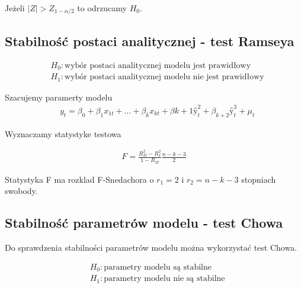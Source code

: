 Jeżeli \(|Z| > Z_{1-\alpha/2}\) to odrzucamy \(H_0\).

\subsection{Stabilność postaci analitycznej - test Ramseya}\label{subsec:stabilność-postaci-analitycznej---test-ramseya}

\begin{equation}
    \begin{split}
        &H_0: \text{wybór postaci analitycznej modelu jest prawidłowy} \\
        &H_1: \text{wybór postaci analitycznej modelu nie jest prawidłowy}
    \end{split}
\end{equation}


Szacujemy paramerty modelu
\begin{equation}
    \begin{split}
        &y_{t} = \beta_{0} + \beta_{1}x_{1t} + \dots + \beta_{k}x_{kt} +\beta{k+1}ŷ_{t}^{2} + \beta_{k+2}ŷ_{t}^{3} + \mu_{t}
    \end{split}
\end{equation}

Wyznaczamy statystyke testowa

\begin{equation}
    \begin{split}
        F = \frac{R_{II}^{2} - R_{I}^{2}}{1-R_{II}} \frac{n-k-3}{2}
    \end{split}
\end{equation}

Statystyka F ma rozklad F-Snedachora o \(r_1=2 \) i \(r_2=n-k-3\) stopniach swobody.

\subsection{Stabilność parametrów modelu - test Chowa}\label{subsec:stabilność-parametrów-modelu}

Do sprawdzenia stabilności parametrów modelu można wykorzystać test Chowa.

\begin{equation}
    \begin{split}
        &H_0: \text{parametry modelu są stabilne} \\
        &H_1: \text{parametry modelu nie są stabilne}
    \end{split}
\end{equation}

